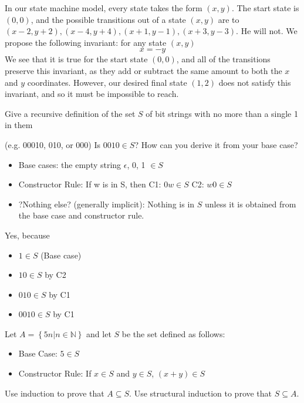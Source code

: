\documentclass[solution, letterpaper]{cs20}
\begin{document}
\begin{solution}
\subsolution In our state machine model, every state takes the form $(x,y)$. The start state is $(0,0)$, and the possible transitions out of a state $(x,y)$ are to $(x-2, y+2),(x-4,y+4),(x+1,y-1),(x+3,y-3)$.
\subsolution He will not.
We propose the following invariant: for any state $(x,y)$ 
\[x = -y \]
We see that it is true for the start state $(0,0)$, and all of the transitions preserve this invariant, as they add or subtract the same amount to both the $x$ and $y$ coordinates. However, our desired final state $(1,2)$ does not satisfy this invariant, and so it must be impossible to reach.
\end{solution}

\subproblem Give a recursive definition of the set $S$ of bit strings with no more than a single 1 in them 

(e.g. 00010, 010, or 000)
\subproblem Is $0010\in S$? How can you derive it from your base case?

\begin{solution}
\subsolution
\begin{itemize}
\item Base cases: the empty string $\epsilon$, 0, 1 $\in S$
\item Constructor Rule: If w is in S, then
\subitem C1: $0w\in S$
\subitem C2: $w0\in S$
\item ?Nothing else? (generally implicit): Nothing is in $S$ unless it is obtained from the base case and constructor rule.
\end{itemize}
\subsolution Yes, because
\begin{itemize}
\item $1\in S$ (Base case)
\item $10\in S$ by C2 
\item $010\in S$ by C1
\item $0010\in S$ by C1
\end{itemize}
\end{solution}

Let $A = \left\{ {5n|n\in\mathbb{N}}\right\}$ and let $S$ be the set defined as follows:
\begin{itemize}
\item Base Case: $5 \in S$
\item Constructor Rule: If $x\in S$ and $y\in S$, $(x+y) \in S$ 
\end{itemize}
\subproblem Use induction to prove that $A\subseteq S $.
\subproblem Use structural induction to prove that $S\subseteq A$.
\end{document}
